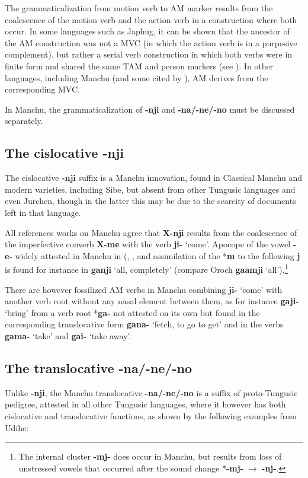 \documentclass{article}
\newcommand{\ipa}[1]{\textbf{{\phon\mbox{#1}}}} %
\begin{document}
The grammaticalization from motion verb to AM marker results from the coalescence of the motion  verb and the action verb in a construction where both occur. In some languages such as Japhug, it can be shown that the ancestor of the AM construction was not a MVC (in which the action verb is in a purposive complement), but rather a serial verb construction in which both verbs were in finite form and shared the same TAM and person markers (see \citealt{jacques13harmonization}). In other languages, including Manchu (and some cited by \citealt[70;155]{heine-kuteva02}), AM derives from the corresponding MVC.

In Manchu, the grammaticalization of \ipa{-nji} and \ipa{-na/-ne/-no} must be discussed separately.

\subsection{The cislocative \ipa{-nji} }
The cislocative \ipa{-nji} suffix is a Manchu innovation, found in Classical Manchu and modern varieties, including Sibe, but absent from other Tungusic languages and even Jurchen, though in the latter this may be due to the scarcity of documents left in that language.

All references works on Manchu agree that \ipa{X-nji} results from the coalescence of the imperfective converb \ipa{X-me} with the verb \ipa{ji-} `come'. Apocope of the vowel \ipa{-e-} widely attested in Manchu in (\citealt[18-19]{hattori56manchu}, \citet[43-44]{gorelova02manchu}, and assimilation of the *\ipa{m} to the following \ipa{j} is found for instance in \ipa{ganji} `all, completely' (compare Oroch \ipa{gaamji} `all').\footnote{The internal cluster \ipa{-mj-} does occur in Manchu, but results from loss of unstressed vowels that occurred after the sound change *\ipa{-mj-} $\rightarrow$ \ipa{-nj-}. }


There are however fossilized AM verbs in Manchu combining \ipa{ji-} `come' with another verb root without any nasal element between them, as for instance \ipa{gaji-} `bring' from a verb root *\ipa{ga-} not attested on its own but found in the corresponding translocative form \ipa{gana-} `fetch, to go to get' and in the verbs \ipa{gama-} `take' and  \ipa{gai-} `take away'. 


\subsection{The translocative \ipa{-na/-ne/-no} } \label{sec:translocative}
Unlike \ipa{-nji}, the Manchu translocative \ipa{-na/-ne/-no} is a suffix of proto-Tungusic pedigree, attested in all other Tungusic languages, where it however has both cislocative and translocative functions, as shown by the following examples from Udihe:
\end{document}
